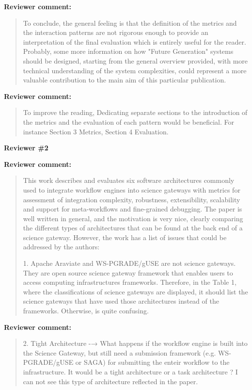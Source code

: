 \documentclass[a4]{letter}
\newenvironment{review}%
{\textbf{Reviewer comment:}\begin{quote}}%
{\end{quote}}%
\begin{document}
\begin{letter}{}
\begin{review}
To conclude, the general feeling is that the definition of the metrics and the interaction patterns are not rigorous enough to provide an interpretation of the final evaluation which is entirely useful for the reader. Probably, some more information on how "Future Generation" systems should be designed, starting from the general overview provided, with more technical understanding of the system complexities, could represent a more valuable contribution to the main aim of this particular publication.
\end{review}

\begin{review}
To improve the reading, Dedicating separate sections to the introduction of the metrics and the evaluation of each pattern would be beneficial. For instance Section 3 Metrics, Section 4 Evaluation.
\end{review}

\textbf{Reviewer \#2}

\begin{review}
  This work describes and evaluates six software architectures
  commonly used to integrate workflow engines into science gateways
  with metrics for assessment of integration complexity, robustness,
  extensibility, scalability and support for meta-workflows and
  fine-grained debugging. The paper is well written in general, and
  the motivation is very nice, clearly comparing the different types
  of architectures that can be found at the back end of a science
  gateway. However, the work has a list of issues that could be
  addressed by the authors:

1. Apache Araviate and WS-PGRADE/gUSE are not science gateways. They
are open source science gateway framework that enables users to access
computing infrastructures frameworks. Therefore, in the Table 1, where
the classifications of science gateways are displayed, it should list
the science gateways that have used those architectures instead of the
frameworks. Otherwise, is quite confusing.
\end{review}

\begin{review}
  2. Tight Architecture -→ What happens if the workflow engine is
  built into the Science Gateway, but still need a submission
  framework (e.g. WS-PGRADE/gUSE or SAGA) for submitting the enteir
  workflow to the infrastructure.  It would be a tight architecture or
  a task architecture ? I can not see this type of architecture
  reflected in the paper.
\end{review}


\end{letter}
\end{document}

